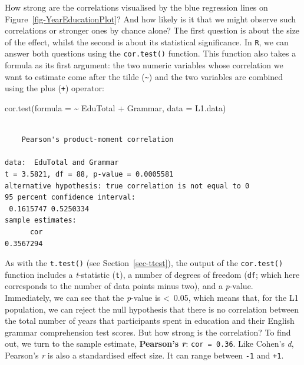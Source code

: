 \documentclass[
  letterpaper,
  DIV=11,
  numbers=noendperiod]{scrreprt}
\newenvironment{Shaded}{\begin{snugshade}}{\end{snugshade}}
\newcommand{\AttributeTok}[1]{\textcolor[rgb]{0.40,0.45,0.13}{#1}}
\newcommand{\FunctionTok}[1]{\textcolor[rgb]{0.28,0.35,0.67}{#1}}
\newcommand{\NormalTok}[1]{\textcolor[rgb]{0.00,0.23,0.31}{#1}}
\newcommand{\SpecialCharTok}[1]{\textcolor[rgb]{0.37,0.37,0.37}{#1}}
\begin{document}
How strong are the correlations visualised by the blue regression lines
on Figure~\ref{fig-YearEducationPlot}? And how likely is it that we
might observe such correlations or stronger ones by chance alone? The
first question is about the size of the effect, whilst the second is
about its statistical significance. In \texttt{R}, we can answer both
questions using the \texttt{cor.test()} function. This function also
takes a formula as its first argument: the two numeric variables whose
correlation we want to estimate come after the tilde
(\texttt{\textasciitilde{}}) and the two variables are combined using
the plus (\texttt{+}) operator:

\begin{Shaded}
\begin{Highlighting}[]
\FunctionTok{cor.test}\NormalTok{(}\AttributeTok{formula =} \SpecialCharTok{\textasciitilde{}}\NormalTok{ EduTotal }\SpecialCharTok{+}\NormalTok{ Grammar,}
         \AttributeTok{data =}\NormalTok{ L1.data)}
\end{Highlighting}
\end{Shaded}

\begin{verbatim}

    Pearson's product-moment correlation

data:  EduTotal and Grammar
t = 3.5821, df = 88, p-value = 0.0005581
alternative hypothesis: true correlation is not equal to 0
95 percent confidence interval:
 0.1615747 0.5250334
sample estimates:
      cor 
0.3567294 
\end{verbatim}

As with the \texttt{t.test()} (see Section~\ref{sec-ttest}), the output
of the \texttt{cor.test()} function includes a \emph{t}-statistic
(\texttt{t}), a number of degrees of freedom (\texttt{df}; which here
corresponds to the number of data points minus two), and a
\emph{p}-value. Immediately, we can see that the \emph{p}-value is
\textless~0.05, which means that, for the L1 population, we can reject
the null hypothesis that there is no correlation between the total
number of years that participants spent in education and their English
grammar comprehension test scores. But how strong is the correlation? To
find out, we turn to the sample estimate, \textbf{Pearson's \emph{r}}:
\texttt{cor\ =\ 0.36}. Like Cohen's \emph{d}, Pearson's \emph{r} is also
a standardised effect size. It can range between \texttt{-1} and
\texttt{+1}.
\end{document}
